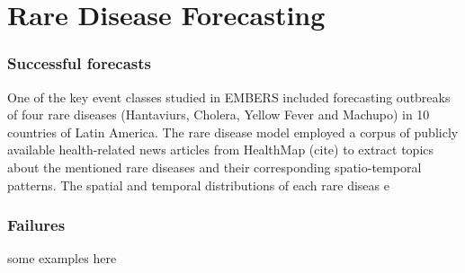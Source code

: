 \section{Rare Disease Forecasting}

\subsubsection{Successful forecasts}

One of the key event classes studied in EMBERS included forecasting outbreaks of four rare diseases (Hantaviurs, Cholera, Yellow Fever and Machupo) in 10 countries of Latin America. The rare disease model employed a corpus of publicly available health-related news articles from HealthMap (cite) to extract topics about the mentioned rare diseases and their corresponding spatio-temporal patterns. The spatial and temporal distributions of each rare diseas e

\subsubsection{Failures}

some examples here
